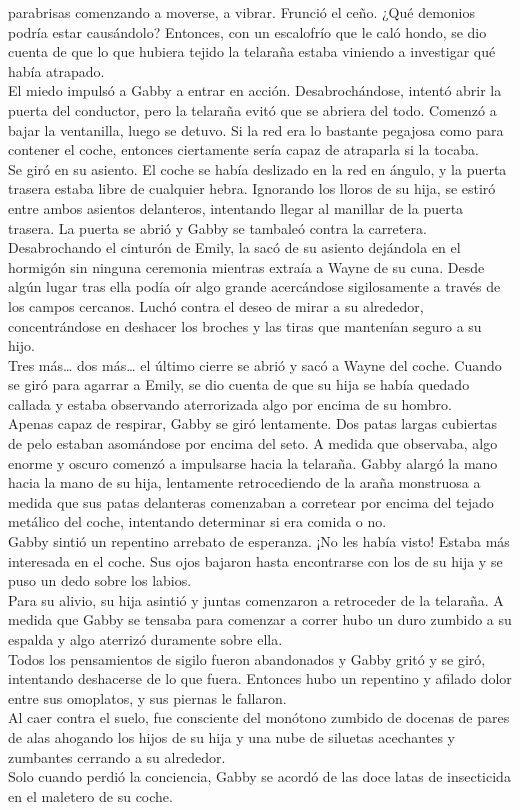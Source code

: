 parabrisas comenzando a moverse, a vibrar. Frunció el ceño. ¿Qué
demonios podría estar causándolo? Entonces, con un escalofrío que le
caló hondo, se dio cuenta de que lo que hubiera tejido la telaraña
estaba viniendo a investigar qué había atrapado.\\
El miedo impulsó a Gabby a entrar en acción. Desabrochándose, intentó
abrir la puerta del conductor, pero la telaraña evitó que se abriera del
todo. Comenzó a bajar la ventanilla, luego se detuvo. Si la red era lo
bastante pegajosa como para contener el coche, entonces ciertamente
sería capaz de atraparla si la tocaba.\\
Se giró en su asiento. El coche se había deslizado en la red en ángulo,
y la puerta trasera estaba libre de cualquier hebra. Ignorando los
lloros de su hija, se estiró entre ambos asientos delanteros, intentando
llegar al manillar de la puerta trasera. La puerta se abrió y Gabby se
tambaleó contra la carretera.\\
Desabrochando el cinturón de Emily, la sacó de su asiento dejándola en
el hormigón sin ninguna ceremonia mientras extraía a Wayne de su cuna.
Desde algún lugar tras ella podía oír algo grande acercándose
sigilosamente a través de los campos cercanos. Luchó contra el deseo de
mirar a su alrededor, concentrándose en deshacer los broches y las tiras
que mantenían seguro a su hijo.\\
Tres más\ldots{} dos más\ldots{} el último cierre se abrió y sacó a
Wayne del coche. Cuando se giró para agarrar a Emily, se dio cuenta de
que su hija se había quedado callada y estaba observando aterrorizada
algo por encima de su hombro.\\
Apenas capaz de respirar, Gabby se giró lentamente. Dos patas largas
cubiertas de pelo estaban asomándose por encima del seto. A medida que
observaba, algo enorme y oscuro comenzó a impulsarse hacia la telaraña.
Gabby alargó la mano hacia la mano de su hija, lentamente retrocediendo
de la araña monstruosa a medida que sus patas delanteras comenzaban a
corretear por encima del tejado metálico del coche, intentando
determinar si era comida o no.\\
Gabby sintió un repentino arrebato de esperanza. ¡No les había visto!
Estaba más interesada en el coche. Sus ojos bajaron hasta encontrarse
con los de su hija y se puso un dedo sobre los labios.\\
Para su alivio, su hija asintió y juntas comenzaron a retroceder de la
telaraña. A medida que Gabby se tensaba para comenzar a correr hubo un
duro zumbido a su espalda y algo aterrizó duramente sobre ella.\\
Todos los pensamientos de sigilo fueron abandonados y Gabby gritó y se
giró, intentando deshacerse de lo que fuera. Entonces hubo un repentino
y afilado dolor entre sus omoplatos, y sus piernas le fallaron.\\
Al caer contra el suelo, fue consciente del monótono zumbido de docenas
de pares de alas ahogando los hijos de su hija y una nube de siluetas
acechantes y zumbantes cerrando a su alrededor.\\
Solo cuando perdió la conciencia, Gabby se acordó de las doce latas de
insecticida en el maletero de su coche.\\
